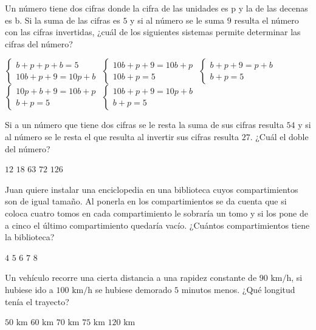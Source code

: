 \documentclass[sin nombre]{srs}
\begin{document}
\begin{preguntas}[after-item-skip=2cm]
\pregunta Un número tiene dos cifras donde la cifra de las unidades es p y la de las decenas es b. Si la suma de las cifras es $5$ y si al número se le suma $9$ resulta el número con las cifras invertidas, ¿cuál de los siguientes sistemas permite determinar las cifras del número?
\begin{vertical}
\alternativa $\begin{cases} b + p + p + b = 5 \\ 10b + p + 9 = 10p + b \end{cases}$
\alternativa $\begin{cases} 10b + p + 9 = 10b + p \\ 10b + p = 5 \end{cases}$
\alternativa $\begin{cases} b + p + 9 = p + b \\ b + p = 5 \end{cases}$
\alternativa $\begin{cases} 10p + b + 9 = 10b + p \\ b + p = 5 \end{cases}$
\alternativa $\begin{cases} 10b + p + 9 = 10p + b \\ b + p = 5 \end{cases}$
\end{vertical}

\pregunta Si a un número que tiene dos cifras se le resta la suma de sus cifras resulta $54$ y si al número se le resta el que resulta al invertir sus cifras resulta $27$. ¿Cuál el doble del número?
\begin{vertical}
\alternativa $12$
\alternativa $18$
\alternativa $63$
\alternativa $72$
\alternativa $126$
\end{vertical}

\pregunta Juan quiere instalar una enciclopedia en una biblioteca cuyos compartimientos son de igual tamaño. Al ponerla en los compartimientos se da cuenta que si coloca cuatro tomos en cada compartimiento le sobraría un tomo y si los pone de a cinco el último compartimiento quedaría vacío. ¿Cuántos compartimientos tiene la biblioteca?
\begin{vertical}
\alternativa $4$
\alternativa $5$
\alternativa $6$
\alternativa $7$
\alternativa $8$
\end{vertical}

\pregunta Un vehículo recorre una cierta distancia a una rapidez constante de $90 \text{ km/h}$, si hubiese ido a $100 \text{ km/h}$ se hubiese demorado $5$ minutos menos. ¿Qué longitud tenía el trayecto?
\begin{vertical}
\alternativa $50 \text{ km}$
\alternativa $60 \text{ km}$
\alternativa $70 \text{ km}$
\alternativa $75 \text{ km}$
\alternativa $120 \text{ km}$
\end{vertical}


\end{preguntas}
\end{document}
